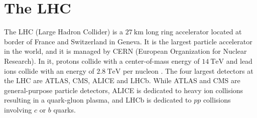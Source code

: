 \section{The LHC}

The LHC (Large Hadron Collider) is a $\qty{27}{\km}$ long ring accelerator located at border of France and Switzerland in Geneva. 
It is the largest particle accelerator in the world, and it is managed by CERN (European Organization for Nuclear Research).
In it, protons collide with a center-of-mass energy of $\qty{14}{\TeV}$ and lead ions collide with an energy of $\qty{2.8}{\TeV}$ per nucleon \cite{LHC}.
The four largest detectors at the LHC are ATLAS\cite{ATLAS}, CMS\cite{CMS}, ALICE\cite{ALICE} and LHCb\cite{LHCb}.
While ATLAS and CMS are general-purpose particle detectors, ALICE is dedicated to heavy ion collisions resulting in a quark-gluon plasma, and LHCb is dedicated to $pp$ collisions involving $c$ or $b$ quarks.